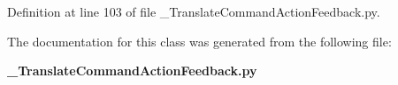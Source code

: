 \subsubsection[{status}]{}\label{classoryx__drive__controller_1_1msg_1_1__TranslateCommandActionFeedback_1_1TranslateCommandActionFeedback_a498e7dd36af6ada358cbfbfa813085f4}


\-Definition at line 103 of file \-\_\-\-Translate\-Command\-Action\-Feedback.\-py.



\-The documentation for this class was generated from the following file\-:\begin{DoxyCompactItemize}
\item 
{\bf \-\_\-\-Translate\-Command\-Action\-Feedback.\-py}\end{DoxyCompactItemize}

